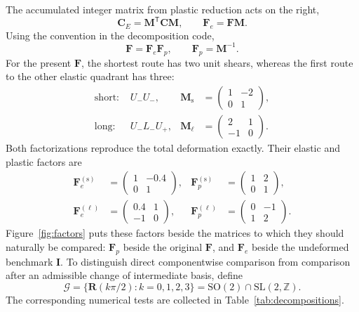 \documentclass[11pt]{article}
\newcommand{\trans}{\mathsf{T}}
\newcommand{\shortp}{\mathrm{s}}
\newcommand{\longp}{\ell}
\newcommand{\SO}{\mathrm{SO}(2)}
\newcommand{\SLZ}{\mathrm{SL}(2,\mathbb{Z})}
\newcommand{\Uminus}{U_{-}}
\newcommand{\Lminus}{L_{-}}
\newcommand{\Uplus}{U_{+}}
\begin{document}
The accumulated integer matrix from plastic reduction acts on the right,
\begin{equation}
 \mathbf C_E=\mathbf M^\trans\mathbf C\mathbf M,
 \qquad
 \mathbf F_e=\mathbf F\mathbf M.
\end{equation}
Using the convention in the decomposition code,
\begin{equation}
 \boxed{
 \mathbf F=\mathbf F_e\mathbf F_p,
 \qquad
 \mathbf F_p=\mathbf M^{-1}.}
 \label{eq:decomposition}
\end{equation}
For the present \(\mathbf F\), the shortest route has two unit shears,
whereas the first route to the other elastic quadrant has three:
\begin{align}
 \text{short: }&\Uminus\Uminus,
 &\mathbf M_{\shortp}&=
 \begin{pmatrix}1&-2\\0&1\end{pmatrix},
 \\
 \text{long: }&\Uminus\Lminus\Uplus,
 &\mathbf M_{\longp}&=
 \begin{pmatrix}2&1\\-1&0\end{pmatrix}.
\end{align}
Both factorizations reproduce the total deformation exactly.  Their elastic
and plastic factors are
\begin{align}
 \mathbf F_e^{(\shortp)}&=
 \begin{pmatrix}1&-0.4\\0&1\end{pmatrix},
 &
 \mathbf F_p^{(\shortp)}&=
 \begin{pmatrix}1&2\\0&1\end{pmatrix},
 \\
 \mathbf F_e^{(\longp)}&=
 \begin{pmatrix}0.4&1\\-1&0\end{pmatrix},
 &
 \mathbf F_p^{(\longp)}&=
 \begin{pmatrix}0&-1\\1&2\end{pmatrix}.
\end{align}
Figure~\ref{fig:factors} puts these factors beside the matrices to which they
should naturally be compared: \(\mathbf F_p\) beside the original
\(\mathbf F\), and \(\mathbf F_e\) beside the undeformed benchmark
\(\mathbf I\).  To distinguish direct componentwise comparison from comparison
after an admissible change of intermediate basis, define
\begin{equation}
 \mathcal G=\{\mathbf R(k\pi/2):k=0,1,2,3\}
 =\SO\cap\SLZ.
 \label{eq:latticegroup}
\end{equation}
The corresponding numerical tests are collected in
Table~\ref{tab:decompositions}.
\end{document}
